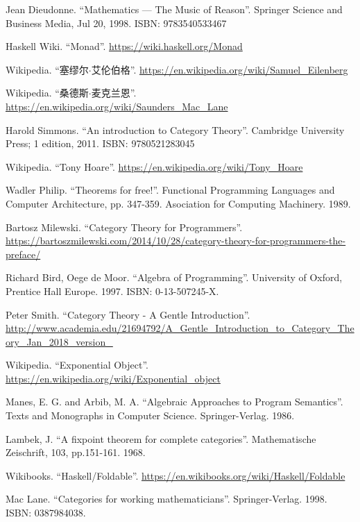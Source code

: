 \documentclass{article}
\begin{document}
\ifx\wholebook\relax \else
\begin{thebibliography}{99}

Jean Dieudonne. ``Mathematics — The Music of Reason''. Springer Science and Business Media, Jul 20, 1998. ISBN: 9783540533467

Haskell Wiki. ``Monad''. \url{https://wiki.haskell.org/Monad}

Wikipedia. ``塞缪尔$\cdot$艾伦伯格''. \url{https://en.wikipedia.org/wiki/Samuel_Eilenberg}

Wikipedia. ``桑德斯$\cdot$麦克兰恩''. \url{https://en.wikipedia.org/wiki/Saunders_Mac_Lane}

Harold Simmons. ``An introduction to Category Theory''.  Cambridge University Press; 1 edition, 2011. ISBN: 9780521283045

Wikipedia. ``Tony Hoare''. \url{https://en.wikipedia.org/wiki/Tony_Hoare}

Wadler Philip. ``Theorems for free!''. Functional Programming Languages and Computer Architecture, pp. 347-359. Asociation for Computing Machinery. 1989.

Bartosz Milewski. ``Category Theory for Programmers''. \url{https://bartoszmilewski.com/2014/10/28/category-theory-for-programmers-the-preface/}

Richard Bird, Oege de Moor. ``Algebra of Programming''. University of Oxford, Prentice Hall Europe. 1997. ISBN: 0-13-507245-X.

Peter Smith. ``Category Theory - A Gentle Introduction''. \url{http://www.academia.edu/21694792/A_Gentle_Introduction_to_Category_Theory_Jan_2018_version_}

Wikipedia. ``Exponential Object''. \url{https://en.wikipedia.org/wiki/Exponential_object}

Manes, E. G. and Arbib, M. A. ``Algebraic Approaches to Program Semantics''. Texts and Monographs in Computer Science. Springer-Verlag. 1986.

Lambek, J. ``A fixpoint theorem for complete categories''. Mathematische Zeischrift, 103, pp.151-161. 1968.

Wikibooks. ``Haskell/Foldable''.  \url{https://en.wikibooks.org/wiki/Haskell/Foldable}

Mac Lane. ``Categories for working mathematicians''. Springer-Verlag. 1998. ISBN: 0387984038.

\end{thebibliography}

\expandafter\enddocument

\fi
\end{document}
